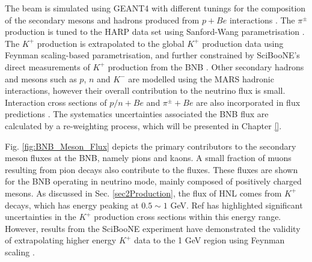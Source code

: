 The beam is simulated using GEANT4 with different tunings for the composition of the secondary mesons and hadrons produced from $p + Be$ interactions \cite{BNBMiniBooNE}.
The $\pi^{\pm}$ production is tuned to the HARP data set using Sanford-Wang parametrisation .
The $K^{+}$ production is extrapolated to the global $K^{+}$ production data using Feynman scaling-based parametrisation, and further constrained by SciBooNE's direct measurements of $K^{+}$ production from the BNB \cite{SciBooNE}. 
Other secondary hadrons and mesons such as $p$, $n$ and $K^{-}$ are modelled using the MARS hadronic interactions, however their overall contribution to the neutrino flux is small. 
Interaction cross sections of $p/n + Be$ and $\pi^{\pm} + Be$ are also incorporated in flux predictions \cite{DavePhd}.   
The systematics uncertainties associated the BNB flux are calculated by a re-weighting process, which will be presented in Chapter \ref{}.

Fig. \ref{fig:BNB_Meson_Flux} depicts the primary contributors to the secondary meson fluxes at the BNB, namely pions and kaons.
A small fraction of muons resulting from pion decays also contribute to the fluxes.
These fluxes are shown for the BNB operating in neutrino mode, mainly composed of positively charged mesons.
As discussed in Sec. \ref{sec2Production}, the flux of HNL comes from $K^{+}$ decays, which has energy peaking at $0.5 \sim 1$ GeV.
Ref \cite{BNBMiniBooNE} has highlighted significant uncertainties in the $K^{+}$ production cross sections within this energy range.
However, results from the SciBooNE experiment have demonstrated the validity of extrapolating higher energy $K^{+}$ data to the 1 GeV region using Feynman scaling \cite{SciBooNE}. 

